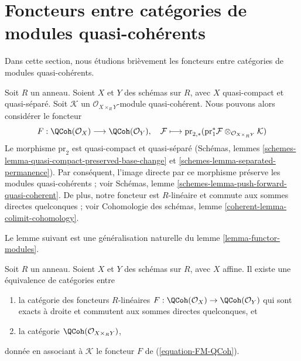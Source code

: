 \section{Foncteurs entre catégories de modules quasi-cohérents}
\label{section-functor-quasi-coherent}

\noindent
Dans cette section, nous étudions brièvement les foncteurs entre catégories de
modules quasi-cohérents.

\begin{example}
\label{example-functor-quasi-coherent}
Soit $R$ un anneau. Soient $X$ et $Y$ des
schémas sur $R$, avec $X$ quasi-compact et quasi-séparé.
Soit $\mathcal{K}$ un $\mathcal{O}_{X \times_R Y}$-module quasi-cohérent.
Nous pouvons alors considérer le foncteur
\begin{equation}
\label{equation-FM-QCoh}
F : \QCoh(\mathcal{O}_X) \longrightarrow \QCoh(\mathcal{O}_Y),\quad
\mathcal{F} \longmapsto
\text{pr}_{2, *}(\text{pr}_1^*\mathcal{F}
\otimes_{\mathcal{O}_{X \times_R Y}} \mathcal{K})
\end{equation}
Le morphisme $\text{pr}_2$ est quasi-compact et quasi-séparé
(Schémas, lemmes \ref{schemes-lemma-quasi-compact-preserved-base-change}
et \ref{schemes-lemma-separated-permanence}). Par conséquent, l'image directe par
ce morphisme préserve les modules quasi-cohérents ; voir
Schémas, lemme \ref{schemes-lemma-push-forward-quasi-coherent}.
De plus, notre foncteur est $R$-linéaire et commute aux sommes directes quelconques ;
voir Cohomologie des schémas, lemme \ref{coherent-lemma-colimit-cohomology}.
\end{example}

\noindent
Le lemme suivant est une généralisation naturelle du
lemme \ref{lemma-functor-modules}.

\begin{lemma}
\label{lemma-functor-quasi-coherent-from-affine}
Soit $R$ un anneau. Soient $X$ et $Y$ des schémas sur $R$, avec $X$ affine.
Il existe une équivalence de catégories entre
\begin{enumerate}
\item la catégorie des foncteurs $R$-linéaires
$F : \QCoh(\mathcal{O}_X) \to \QCoh(\mathcal{O}_Y)$
qui sont exacts à droite et commutent aux sommes directes quelconques, et
\item la catégorie $\QCoh(\mathcal{O}_{X \times_R Y})$,
\end{enumerate}
donnée en associant à $\mathcal{K}$ le foncteur $F$ de (\ref{equation-FM-QCoh}).
\end{lemma}

